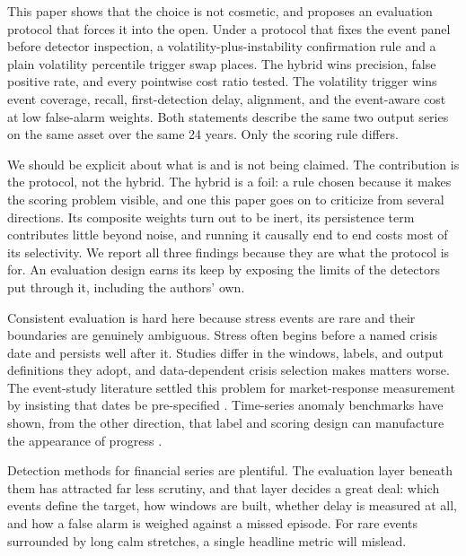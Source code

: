 \documentclass[pdflatex,sn-mathphys-num,iicol]{sn-jnl}
\begin{document}
This paper shows that the choice is not cosmetic, and proposes an evaluation protocol that forces it into the open. Under a protocol that fixes the event panel before detector inspection, a volatility-plus-instability confirmation rule and a plain volatility percentile trigger swap places. The hybrid wins precision, false positive rate, and every pointwise cost ratio tested. The volatility trigger wins event coverage, recall, first-detection delay, alignment, and the event-aware cost at low false-alarm weights. Both statements describe the same two output series on the same asset over the same 24 years. Only the scoring rule differs.

We should be explicit about what is and is not being claimed. The contribution is the protocol, not the hybrid. The hybrid is a foil: a rule chosen because it makes the scoring problem visible, and one this paper goes on to criticize from several directions. Its composite weights turn out to be inert, its persistence term contributes little beyond noise, and running it causally end to end costs most of its selectivity. We report all three findings because they are what the protocol is for. An evaluation design earns its keep by exposing the limits of the detectors put through it, including the authors' own.

Consistent evaluation is hard here because stress events are rare and their boundaries are genuinely ambiguous. Stress often begins before a named crisis date and persists well after it. Studies differ in the windows, labels, and output definitions they adopt, and data-dependent crisis selection makes matters worse. The event-study literature settled this problem for market-response measurement by insisting that dates be pre-specified \cite{brown1985, mackinlay1997}. Time-series anomaly benchmarks have shown, from the other direction, that label and scoring design can manufacture the appearance of progress \cite{lavin2015, wu2022}.

Detection methods for financial series are plentiful. The evaluation layer beneath them has attracted far less scrutiny, and that layer decides a great deal: which events define the target, how windows are built, whether delay is measured at all, and how a false alarm is weighed against a missed episode. For rare events surrounded by long calm stretches, a single headline metric will mislead.
\end{document}
